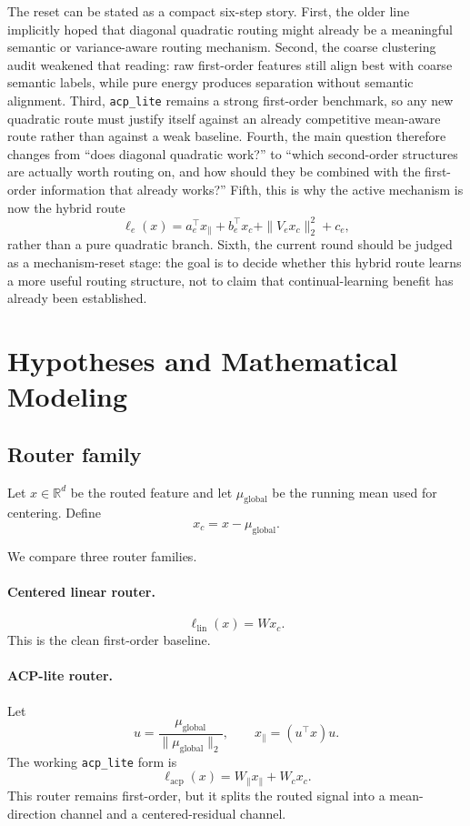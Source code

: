 \documentclass[11pt]{article}
\begin{document}
The reset can be stated as a compact six-step story. First, the older line implicitly hoped that diagonal quadratic routing might already be a meaningful semantic or variance-aware routing mechanism. Second, the coarse clustering audit weakened that reading: raw first-order features still align best with coarse semantic labels, while pure energy produces separation without semantic alignment. Third, \texttt{acp\_lite} remains a strong first-order benchmark, so any new quadratic route must justify itself against an already competitive mean-aware route rather than against a weak baseline. Fourth, the main question therefore changes from ``does diagonal quadratic work?'' to ``which second-order structures are actually worth routing on, and how should they be combined with the first-order information that already works?'' Fifth, this is why the active mechanism is now the hybrid route
\[
\ell_e(x)
=
a_e^\top x_{\parallel}
+
b_e^\top x_c
+
\|V_e x_c\|_2^2
+
c_e,
\]
rather than a pure quadratic branch. Sixth, the current round should be judged as a mechanism-reset stage: the goal is to decide whether this hybrid route learns a more useful routing structure, not to claim that continual-learning benefit has already been established.

\section{Hypotheses and Mathematical Modeling}

\subsection{Router family}

Let $x \in \mathbb{R}^d$ be the routed feature and let $\mu_{\mathrm{global}}$ be the running mean used for centering. Define
\[
x_c = x - \mu_{\mathrm{global}}.
\]

We compare three router families.

\paragraph{Centered linear router.}
\[
\ell_{\mathrm{lin}}(x) = W x_c.
\]
This is the clean first-order baseline.

\paragraph{ACP-lite router.}
Let
\[
u = \frac{\mu_{\mathrm{global}}}{\|\mu_{\mathrm{global}}\|_2},
\qquad
x_{\parallel} = (u^\top x)u.
\]
The working \texttt{acp\_lite} form is
\[
\ell_{\mathrm{acp}}(x) = W_{\parallel}x_{\parallel} + W_c x_c.
\]
This router remains first-order, but it splits the routed signal into a mean-direction channel and a centered-residual channel.
\end{document}
